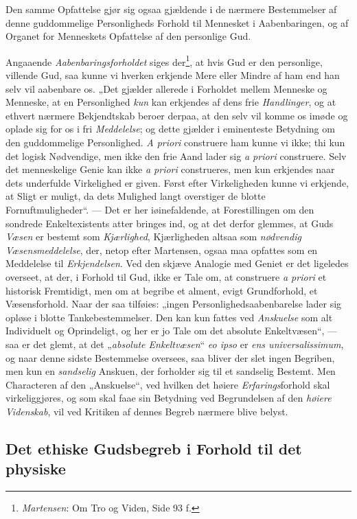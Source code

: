 \documentclass[12pt,a4paper]{book}
\newcommand{\opage}[1]{\marginnote{\footnotesize\textit{[#1]}}}
\begin{document}
\opage{70}Den samme Opfattelse gjør sig ogsaa gjældende i de nærmere Bestemmelser af denne
guddommelige Personligheds Forhold til Mennesket i Aabenbaringen, og af Organet for
Menneskets Opfattelse af den personlige Gud.

Angaaende \emph{Aabenbaringsforholdet} siges der\footnote{\emph{Martensen}: Om Tro og Viden, Side
93 f.}, at hvis Gud er den personlige, villende Gud, saa kunne vi hverken erkjende
Mere eller Mindre af ham end han selv vil aabenbare os. „Det gjælder allerede i
Forholdet mellem Menneske og Menneske, at en Personlighed \emph{kun} kan erkjendes
af dens frie \emph{Handlinger}, og at ethvert nærmere Bekjendtskab beroer derpaa, at
den selv vil komme os imøde og oplade sig for os i fri \emph{Meddelelse}; og dette gjælder
i eminenteste Betydning om den guddommelige Personlighed. \textit{A priori}
construere ham kunne vi ikke; thi kun det logisk Nødvendige, men ikke den frie Aand
lader sig \textit{a priori} construere. Selv det menneskelige Genie kan ikke
\textit{a priori} construeres, men kun erkjendes naar dets underfulde Virkelighed er
given. Først efter Virkeligheden kunne vi erkjende, at Sligt er muligt, da dets
Mulighed langt overstiger de blotte Fornuftmuligheder“. --- Det er her
iøinefaldende, at Forestillingen om den sondrede Enkeltexistents atter bringes ind,
og at det derfor glemmes, at Guds \emph{Væsen} er bestemt som \emph{Kjærlighed}, Kjærligheden
altsaa som \emph{nødvendig Væsensmeddelelse}, der, netop efter Martensen, ogsaa maa
opfattes som en Meddelelse til \emph{Erkjendelsen}. Ved den skjæve Analogie med Geniet er
det ligeledes overseet, at der, i Forhold til Gud, ikke er Tale om, at construere
\textit{a priori} et historisk Fremtidigt, men om at begribe et alment, evigt
Grundforhold, et Væsensforhold. Naar der saa tilføies: „ingen
Personlighedsaabenbarelse lader sig opløse i blotte Tankebestemmelser. Den kan kun
fattes ved \emph{Anskuelse} som alt Individuelt og Oprindeligt, og her er jo Tale om det
absolute Enkeltvæsen“, --- saa er det glemt, at det „\emph{absolute Enkelt\opage{71}væsen}“
\textit{eo ipso} er \textit{ens universalissimum}, og naar denne sidste Bestemmelse
oversees, saa bliver der slet ingen Begriben, men kun en \emph{sandselig} Anskuen, der
forholder sig til et sandselig Bestemt. Men Characteren af den „Anskuelse“, ved
hvilken det høiere \emph{Erfarings}forhold skal virkeliggjøres, og som skal faae sin
Betydning ved Begrundelsen af den \emph{høiere Videnskab}, vil ved Kritiken af dennes
Begreb nærmere blive belyst.

\subsection{Det ethiske Gudsbegreb i Forhold til det physiske}
\label{ssec:ethisk-physisk}
\end{document}
